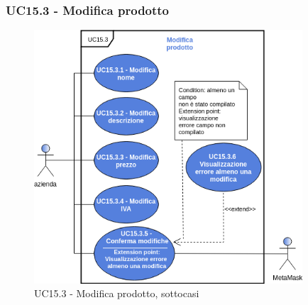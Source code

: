 \subsubsection{UC15.3 - Modifica prodotto}
\begin{figure}[H]
	\includegraphics[width=10cm]{res/images/UC15-3.png}
	\centering
	\caption{UC15.3 - Modifica prodotto, sottocasi}
\end{figure}
